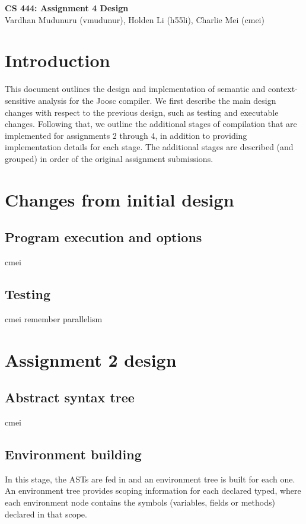 \documentclass[12pt]{article}
\begin{document}
\begin{center}
  \textbf{\Large{CS 444: Assignment 4 Design}} \\
  \vspace{5pt}
  Vardhan Mudunuru (vmudunur), Holden Li (h55li), Charlie Mei (cmei) \\
\end{center}
\vspace{5pt}

\section*{Introduction}

This document outlines the design and implementation of semantic and
context-sensitive analysis for the Joosc compiler. We first describe the main
design changes with respect to the previous design, such as testing and
executable changes. Following that, we outline the additional stages of
compilation that are implemented for assignments 2 through 4, in addition to
providing implementation details for each stage. The additional stages are
described (and grouped) in order of the original assignment submissions.

\section{Changes from initial design}

\subsection{Program execution and options}
cmei

\subsection{Testing}
cmei
remember parallelism

\section{Assignment 2 design}

\subsection{Abstract syntax tree}
cmei

\subsection{Environment building}
In this stage, the ASTs are fed in and an environment tree is built for each
one.  An environment tree provides scoping information for each declared typed,
where each environment node contains the symbols (variables, fields or methods)
declared in that scope.
\end{document}
